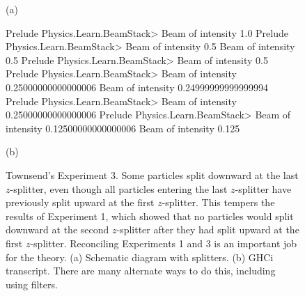 \documentclass{eptcs}
\newcommand{\FunctionTok}[1]{\textcolor[rgb]{0.02,0.16,0.49}{{#1}}}
\newcommand{\darkgreen}[1]{\textcolor[rgb]{0.00,0.80,0.00}{#1}}
\begin{document}
\begin{figure}
  \begin{center}

(a)
  \end{center}
\begin{center}
\begin{Highlighting}[]
Prelude Physics.Learn.BeamStack> \color{blue}{randomBeam}
\darkgreen{Beam of intensity 1.0}
Prelude Physics.Learn.BeamStack> \color{blue}{splitZ it}
\darkgreen{Beam of intensity 0.5}
\darkgreen{Beam of intensity 0.5}
Prelude Physics.Learn.BeamStack> \color{blue}{dropBeam it}
\darkgreen{Beam of intensity 0.5}
Prelude Physics.Learn.BeamStack> \color{blue}{splitX it}
\darkgreen{Beam of intensity 0.25000000000000006}
\darkgreen{Beam of intensity 0.24999999999999994}
Prelude Physics.Learn.BeamStack> \color{blue}{dropBeam it}
\darkgreen{Beam of intensity 0.25000000000000006}
Prelude Physics.Learn.BeamStack> \color{blue}{splitZ it}
\darkgreen{Beam of intensity 0.12500000000000006}
\darkgreen{Beam of intensity 0.125}
\end{Highlighting}

(b)
\end{center}
\caption{Townsend's Experiment 3.  Some particles split downward
  at the last $z$-splitter, even though all particles entering the
  last $z$-splitter have previously split upward at the first
  $z$-splitter.  This tempers the results of Experiment 1,
  which showed that no particles would split downward at the second $z$-splitter
  after they had split upward at the first $z$-splitter.
  Reconciling Experiments 1 and 3 is an important job for the theory.
  (a) Schematic diagram with splitters.
  (b) GHCi transcript.  There are many alternate ways to do this,
  including using filters.
}
\label{townsend3fig}
\end{figure}
\end{document}

